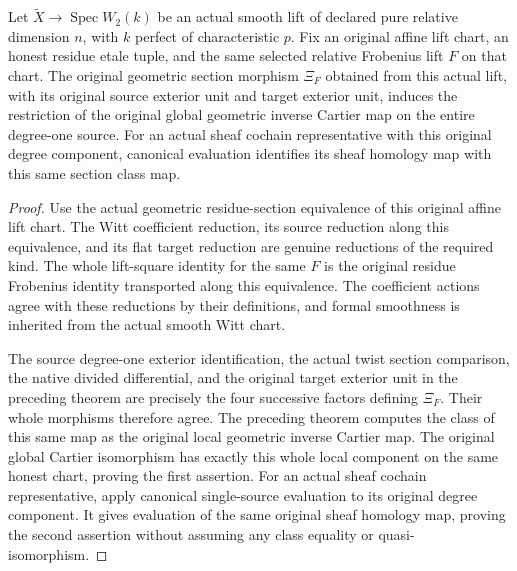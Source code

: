 \begin{corollary}
\label{cor:di-actual-witt-chart-leading-cartier}
\leanok
Let $\widetilde X\to\operatorname{Spec}W_2(k)$ be an actual smooth lift
of declared pure relative dimension $n$, with $k$ perfect of
characteristic $p$. Fix an original affine lift chart, an honest residue
etale tuple, and the same selected relative Frobenius lift $F$ on that
chart. The original geometric section morphism $\Xi_F$ obtained from
this actual lift, with its original source exterior unit and target
exterior unit, induces the restriction of the original global
geometric inverse Cartier map on the entire degree-one source.
For an actual sheaf cochain representative with this original degree
component, canonical evaluation identifies its sheaf homology map with
this same section class map.
\end{corollary}
\begin{proof}
Use the actual geometric residue-section equivalence of this original
affine lift chart. The Witt coefficient reduction, its source reduction
along this equivalence, and its flat target reduction are genuine
reductions of the required kind. The whole lift-square identity for
the same $F$ is the original residue Frobenius identity transported
along this equivalence. The coefficient actions agree with these
reductions by their definitions, and formal smoothness is inherited
from the actual smooth Witt chart.

The source degree-one exterior identification, the actual twist section
comparison, the native divided differential, and the original target
exterior unit in the preceding theorem are precisely the four
successive factors defining $\Xi_F$. Their whole morphisms therefore
agree. The preceding theorem computes the class of this same map as
the original local geometric inverse Cartier map. The original global
Cartier isomorphism has exactly this whole local component on the same
honest chart, proving the first assertion. For an actual sheaf cochain
representative, apply canonical single-source evaluation to its original
degree component. It gives evaluation of the same original sheaf
homology map, proving the second assertion without assuming any class
equality or quasi-isomorphism.
\end{proof}

